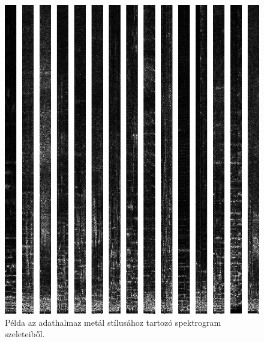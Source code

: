 \begin{figure}[p]
    \includegraphics[height=0.80\paperheight]{src/images/example_slices_metal.png}
    \caption{Példa az adathalmaz metál stílusához tartozó spektrogram szeleteiből.}
\end{figure}

